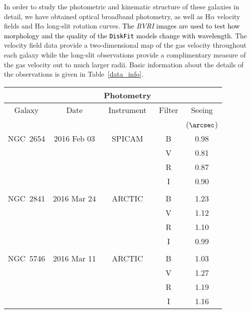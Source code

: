 \documentclass[a4paper,fleqn,usenatbib]{mnras}
\newcommand{\authorfix}{\textcolor{black}}
\begin{document}
In order to study the photometric and kinematic structure of these galaxies in detail, we have obtained optical broadband photometry, as well as H$\alpha$ velocity fields and H$\alpha$ long-slit rotation curves. \authorfix{The \textit{BVRI} images are used to test how morphology and the quality of the \texttt{DiskFit} models change with wavelength.} The velocity field data provide a two-dimensional map of the gas velocity throughout each galaxy while the long-slit observations provide a complimentary measure of the gas velocity out to much larger radii. Basic information about the details of the observations is given in Table~\ref{data_info}. 

\begin{table*}
	\centering
	\caption{Observation details.  Slit position angles are on-sky values, rotating East from North.}
	\label{data_info}
	\begin{tabular}{ccccc}
		\hline
					&				&Photometry	&		&\\
		\hline
		Galaxy		&Date			&Instrument	&Filter	&Seeing\\
					&				&			&		&($\arcsec$)\\
		\hline
		NGC~2654	&2016 Feb 03 		&SPICAM  	&B 		&0.98\\
	                			&                      		&                	& V 		&0.81\\ 
	                 		&                      		&                	& R 		&0.87\\ 
	                 		&                      		&                	& I  		&0.90\\  
	         			&				&			&		&\\
		NGC~2841 	&2016 Mar 24  		&ARCTIC   	&B 		&1.23\\
	                 		&                      		&                	&V 		&1.12\\ 
	                 		&                      		&                	&R 		&1.10\\ 
	                 		&                      		&                	&I  		&0.99\\  
	         			&				&			&		&\\
		NGC~5746 	&2016 Mar 11  		&ARCTIC   	&B 		&1.03\\
	                 		&                      		&                	&V 		&1.27\\ 
	                 		&                      		&                	&R 		&1.19\\ 
	                 		&                      		&                	&I  		&1.16\\ 

\end{tabular}
\end{table*}
\end{document}
